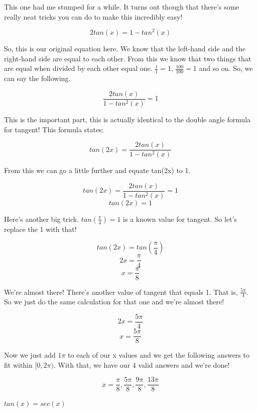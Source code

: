 \documentclass[10pt,letterpaper]{amspset}
\begin{document}
\begin{solution}
    This one had me stumped for a while. It turns out though that there's some really neat tricks you can do to make this incredibly easy! 
    
    \[2tan(x) = 1 - tan^2(x)\]
    
    So, this is our original equation here. We know that the left-hand side and the right-hand side are equal to each other. From this we know that two things that are equal when divided by each other equal one. $\frac{1}{1} = 1$, $\frac{100}{100} = 1$ and so on. So, we can say the following.
    
    \[\frac{2tan(x)}{1 - tan^2(x)} = 1\]
    
    This is the important part, this is actually identical to the double angle formula for tangent! This formula states:
    
    \[tan(2x) = \frac{2tan(x)}{1 - tan^2(x)}\]
    
    From this we can go a little further and equate tan(2x) to 1. 
    
    \[tan(2x) = \frac{2tan(x)}{1 - tan^2(x)} = 1\]
    \[tan(2x) = 1\]
    
    Here's another big trick. $tan \left( \frac{\pi}{4} \right) = 1$ is a known value for tangent. So let's replace the 1 with that!
    
    \[tan(2x) = tan \left( \frac{\pi}{4} \right)\]
    \[2x = \frac{\pi}{4}\]
    \[x = \frac{\pi}{8}\]
    
    We're almost there! There's another value of tangent that equals 1. That is, $\frac{5\pi}{4}$. So we just do the same calculation for that one and we're almost there!
    
        \[2x = \frac{5\pi}{4}\]
        \[x = \frac{5\pi}{8}\]
        
    Now we just add $1\pi$ to each of our x values and we get the following answers to fit within $[0, 2\pi)$. With that, we have our 4 valid answers and we're done! 
    
    \[\boxed{ x = \frac{\pi}{8}, \frac{5\pi}{8}, \frac{9\pi}{8}, \frac{13\pi}{8} }\]
\end{solution}

\pagebreak


\begin{problem}[42]
    $tan(x) = sec(x)$
\end{problem}
\end{document}
